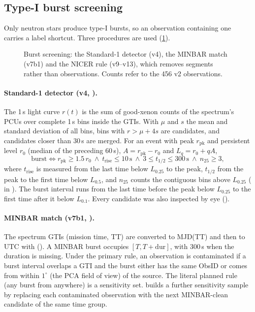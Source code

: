 \subsection{Type-I burst screening}\label{sec:bursts}
Only neutron stars produce type-I bursts, so an observation containing one carries a label shortcut. Three procedures are
used (\cref{fig:burstflow}).

\begin{figure}[htbp]
\centering

\caption{Burst screening: the Standard-1 detector (v4), the MINBAR match (v7b1) and the NICER rule (v9--v13), which removes
segments rather than observations. Counts refer to the 456 v2 observations.}\label{fig:burstflow}
\end{figure}

\paragraph{Standard-1 detector (v4, ).} The 1\,s light curve $r(t)$ is the sum of good-xenon
counts of the spectrum's PCUs over complete 1\,s bins inside the GTIs. With $\mu$ and $s$ the mean and standard deviation of
all bins, bins with $r>\mu+4s$ are candidates, and candidates closer than 30\,s are merged. For an event with peak
$r_\mathrm{pk}$ and persistent level $r_0$ (median of the preceding 60\,s), $A=r_\mathrm{pk}-r_0$ and $L_q=r_0+qA$,
\begin{equation}
\text{burst}\iff r_\mathrm{pk}\ge1.5\,r_0\ \wedge\ t_\mathrm{rise}\le10\,\mathrm{s}\ \wedge\ 3\le t_{1/2}\le300\,\mathrm{s}\ \wedge\ n_{25}\ge3,\label{eq:burst}
\end{equation}
where $t_\mathrm{rise}$ is measured from the last time below $L_{0.25}$ to the peak, $t_{1/2}$ from the peak to the first time
below $L_{0.5}$, and $n_{25}$ counts the contiguous bins above $L_{0.25}$ ( in ). The burst
interval runs from the last time before the peak below $L_{0.25}$ to the first time after it below $L_{0.1}$. Every
candidate was also inspected by eye ().

\paragraph{MINBAR match (v7b1, ).} The spectrum GTIs (mission time, TT) are converted to MJD(TT) and
then to UTC with  (). A MINBAR burst occupies $[T,T+\mathrm{dur}]$, with 300\,s when the
duration is missing. Under the primary rule, an observation is contaminated if a burst interval overlaps a GTI and the burst
either has the same ObsID or comes from within $1^\circ$ (the PCA field of view) of the source. The literal planned rule
(any burst from anywhere) is a sensitivity set.  builds a further sensitivity sample by replacing
each contaminated observation with the next MINBAR-clean candidate of the same time group.

